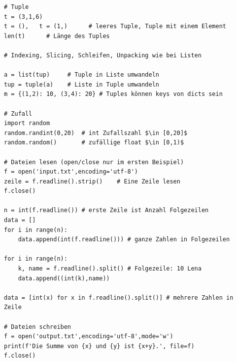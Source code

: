 \documentclass[a4paper,11pt,landscape,twocolumn]{book}
\begin{document}
\begin{lstlisting}
# Tuple
t = (3,1,6)
t = (),   t = (1,)      # leeres Tuple, Tuple mit einem Element
len(t)      # Länge des Tuples

# Indexing, Slicing, Schleifen, Unpacking wie bei Listen

a = list(tup)     # Tuple in Liste umwandeln
tup = tuple(a)    # Liste in Tuple umwandeln
m = {(1,2): 10, (3,4): 20} # Tuples können keys von dicts sein

# Zufall
import random
random.randint(0,20)  # int Zufallszahl $\in [0,20]$
random.random()       # zufällige float $\in [0,1)$

# Dateien lesen (open/close nur im ersten Beispiel)
f = open('input.txt',encoding='utf-8')   
zeile = f.readline().strip()    # Eine Zeile lesen
f.close()
                          
n = int(f.readline()) # erste Zeile ist Anzahl Folgezeilen
data = []           
for i in range(n):
    data.append(int(f.readline())) # ganze Zahlen in Folgezeilen

for i in range(n):
    k, name = f.readline().split() # Folgezeile: 10 Lena
    data.append((int(k),name))
 
data = [int(x) for x in f.readline().split()] # mehrere Zahlen in Zeile

# Dateien schreiben
f = open('output.txt',encoding='utf-8',mode='w')
print(f'Die Summe von {x} und {y} ist {x+y}.', file=f)
f.close()
\end{lstlisting}
\end{document}
